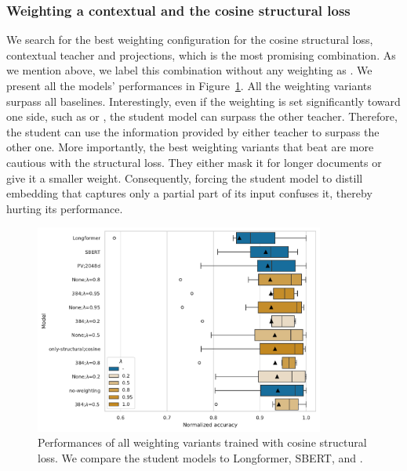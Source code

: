 \subsubsection{Weighting a contextual and the cosine structural loss}

We search for the best weighting configuration for the cosine structural loss,
 contextual teacher and 
projections, which is the most promising combination. As we mention above, we
label this combination without any weighting as . We
present all the models' performances in Figure~\ref{fig:cos_weighting}. All the
weighting variants surpass all baselines. Interestingly, even if the weighting
is set significantly toward one side, such as  or
, the student model can surpass the other teacher.
Therefore, the student can use the information provided by either teacher to
surpass the other one. More importantly, the best weighting variants that beat
 are more cautious with the structural loss. They
either mask it for longer documents or give it a smaller weight. Consequently,
forcing the student model to distill embedding that captures only a partial
part of its input confuses it, thereby hurting its performance.

\begin{figure}
  \centering
  \includegraphics[width=0.85\textwidth]{img/cos_weighting.pdf}

  \caption{Performances of all weighting variants trained with cosine
  structural loss. We compare the student models to Longformer, SBERT, and
  .}

  \label{fig:cos_weighting}

\end{figure}

